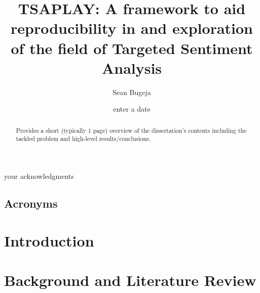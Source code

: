 \documentclass[12pt, a4paper]{report}
\theoremstyle{definition}
\theoremstyle{definition}%
\theoremstyle{definition}%
\theoremstyle{definition}%
\theoremstyle{definition}%
\theoremstyle{definition}%
\begin{document}
\title{TSAPLAY: A framework to aid reproducibility in and exploration of the field of Targeted Sentiment Analysis}
\author{Sean Bugeja}
\date{enter a date}

\frontmatter


\begin{acknowledgements}
	your acknowledgments
\end{acknowledgements}

\begin{abstract}
	Provides a short (typically 1 page) overview of the dissertation's contents including the tackled problem and high-level results/conclusions.
\end{abstract}

\tableofcontents

\listoffigures

\listoftables

\newpage
\section*{Acronyms}
\begin{acronym}
\end{acronym}


\mainmatter

\chapter{Introduction} \label{chap:introduction}


\chapter{Background and Literature Review} \label{chap:background}

\end{document}

